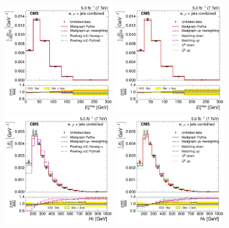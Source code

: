 \begin{figure}[hbtp]
    \centering
     \includegraphics[width=0.435\textwidth]{Chapters/07_08_09_Analysis/Images/results/fit/7TeV/MET/central/normalised_xsection_combined_different_generators.pdf}\hfill
     \includegraphics[width=0.435\textwidth]{Chapters/07_08_09_Analysis/Images/results/fit/7TeV/MET/central/normalised_xsection_combined_systematics_shifts.pdf}\\
     \includegraphics[width=0.435\textwidth]{Chapters/07_08_09_Analysis/Images/results/fit/7TeV/HT/central/normalised_xsection_combined_different_generators.pdf}\hfill
     \includegraphics[width=0.435\textwidth]{Chapters/07_08_09_Analysis/Images/results/fit/7TeV/HT/central/normalised_xsection_combined_systematics_shifts.pdf}\\

\end{figure}
